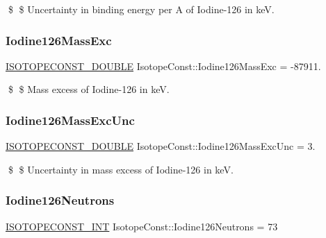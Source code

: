 \$ \$ Uncertainty in binding energy per A of Iodine-\/126 in keV. \mbox{\label{group___isotope_const-_iodine-_i126_gaca97c1ce16b98378d17baa5af9f7eb72}} 
\subsubsection{\texorpdfstring{Iodine126\+Mass\+Exc}{Iodine126MassExc}}
{\footnotesize\ttfamily \mbox{\hyperlink{group___isotope_const-_macros_ga8f45a7272ce02c0b4c65c44636ed719a}{I\+S\+O\+T\+O\+P\+E\+C\+O\+N\+S\+T\+\_\+\+D\+O\+U\+B\+LE}} Isotope\+Const\+::\+Iodine126\+Mass\+Exc = -\/87911.}

\$ \$ Mass excess of Iodine-\/126 in keV. \mbox{\label{group___isotope_const-_iodine-_i126_ga3246e0a8d40f0b3258488872f9498ec2}} 
\subsubsection{\texorpdfstring{Iodine126\+Mass\+Exc\+Unc}{Iodine126MassExcUnc}}
{\footnotesize\ttfamily \mbox{\hyperlink{group___isotope_const-_macros_ga8f45a7272ce02c0b4c65c44636ed719a}{I\+S\+O\+T\+O\+P\+E\+C\+O\+N\+S\+T\+\_\+\+D\+O\+U\+B\+LE}} Isotope\+Const\+::\+Iodine126\+Mass\+Exc\+Unc = 3.}

\$ \$ Uncertainty in mass excess of Iodine-\/126 in keV. \mbox{\label{group___isotope_const-_iodine-_i126_gaeca78b23f5b9f599ce9d3b85af9163f8}} 
\subsubsection{\texorpdfstring{Iodine126\+Neutrons}{Iodine126Neutrons}}
{\footnotesize\ttfamily \mbox{\hyperlink{group___isotope_const-_macros_ga5f18360b3e99483a35c32d789e62621c}{I\+S\+O\+T\+O\+P\+E\+C\+O\+N\+S\+T\+\_\+\+I\+NT}} Isotope\+Const\+::\+Iodine126\+Neutrons = 73}

